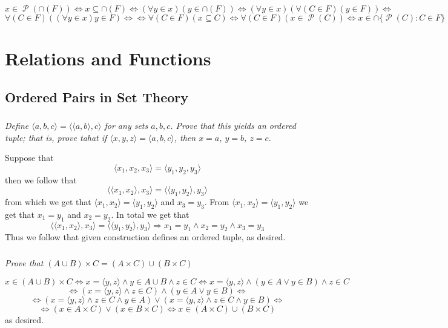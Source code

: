 \documentclass[11pt,oneside,titlepage]{book}
\DeclareMathOperator \pow {\mathcal {P}}
\DeclareMathOperator \lra {\Leftrightarrow}
\DeclareMathOperator \imp {\Rightarrow}
\newcommand{\eangle}[1]{\langle #1 \rangle}
\begin{document}
$$x \in \pow(\cap (F)) \lra x \subseteq \cap (F) \lra (\forall y \in x)(y \in \cap (F)) \lra
(\forall y \in x)(\forall (C \in F) (y \in F)) \lra $$
$$
\forall (C \in F) ( (\forall y \in x) y \in F) \lra
\lra \forall(C \in F)(x \subseteq C) \lra \forall(C \in F)(x \in \pow(C)) \lra x \in  \cap\{\pow(C): C \in F\}$$

\chapter{Relations and Functions}

\section{Ordered Pairs in Set Theory}

\subsection{}

\textit{Define $\eangle{a, b, c} = \eangle{\eangle{a, b}, c}$ for any sets $a, b, c$. Prove that this yields an
  ordered tuple; that is, prove tahat if $\eangle{x, y, z} = \eangle{a, b, c}$, then $x = a$, $y = b$, $z = c$.}

Suppose that
$$\eangle{x_1, x_2, x_3} = \eangle{y_1, y_2, y_3}$$
then we follow that
$$\eangle{\eangle{x_1, x_2}, x_3} = \eangle{\eangle{y_1, y_2}, y_3}$$
from which we get that $\eangle{x_1, x_2} = \eangle{y_1, y_2}$ and $x_3 = y_3$. From
$\eangle{x_1, x_2} = \eangle{y_1, y_2}$ we get that $x_1  = y_1$ and $x_2 = y_2$. In
total we get that
$$\eangle{\eangle{x_1, x_2}, x_3} = \eangle{\eangle{y_1, y_2}, y_3}
\imp x_1 = y_1 \land x_2 = y_2 \land x_3 = y_3$$
Thus we follow that given construction defines an ordered tuple, as desired.

\subsection{}

\textit{Prove that $(A \cup B) \times C = (A \times C) \cup (B \times C)$}

$$x \in (A \cup B) \times C \lra x = \eangle{y, z} \land y \in A \cup B \land z \in C
\lra  x = \eangle{y, z} \land (y \in A \lor y \in  B) \land z \in C $$
$$ \lra  (x = \eangle{y, z} \land z \in C ) \land (y \in A \lor y \in  B) \lra $$
$$\lra 
(x = \eangle{y, z} \land z \in C \land y \in A ) \lor
(x = \eangle{y, z} \land z \in C \land y \in B ) \lra$$
$$\lra 
(x \in A \times C ) \lor (x \in B \times C) \lra x \in (A \times C) \cup (B \times C)$$
as desired.
\end{document}
